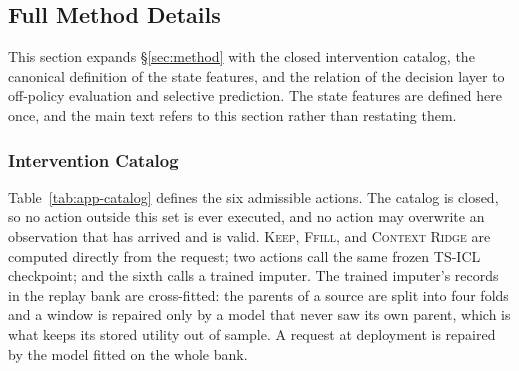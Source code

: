 \documentclass{article}
\begin{document}
\subsection{Full Method Details}
\label{app:method-details}
This section expands \S\ref{sec:method} with the closed intervention catalog, the canonical
definition of the state features, and the relation of the decision layer to off-policy
evaluation and selective prediction. The state features are defined here once, and the main
text refers to this section rather than restating them.

\subsubsection{Intervention Catalog}
\label{app:catalog}
Table~\ref{tab:app-catalog} defines the six admissible actions. The catalog is closed, so no
action outside this set is ever executed, and no action may overwrite an observation that has
arrived and is valid. \textsc{Keep}, \textsc{Ffill}, and \textsc{Context Ridge} are computed
directly from the request; two actions call the same frozen TS-ICL checkpoint; and the sixth
calls a trained imputer. The trained imputer's records in the replay bank are cross-fitted:
the parents of a source
are split into four folds and a window is repaired only by a model that never saw its own
parent, which is what keeps its stored utility out of sample. A request at deployment is
repaired by the model fitted on the whole bank.

\begin{table}[h]
  \caption{The six admissible interventions. Observed entries are the entries that are
  present and valid in the reference input $X^{a_0}$, and an action that modified them would
  violate the integrity constraint of \S\ref{sec:method-problem}.}
  \label{tab:app-catalog}
  \centering
  \small
  \setlength{\tabcolsep}{4pt}
\end{table}
\end{document}
